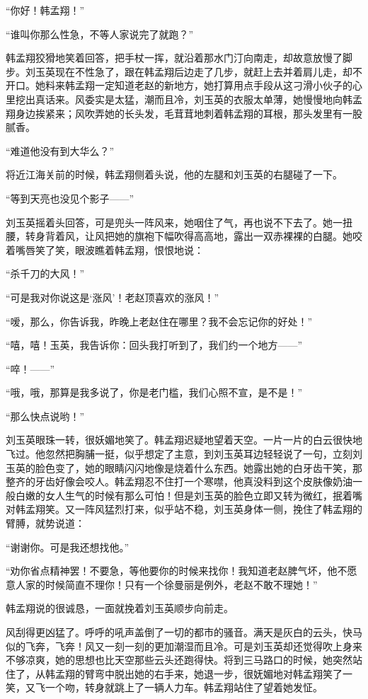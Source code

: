 \par “你好！韩孟翔！”
\par “谁叫你那么性急，不等人家说完了就跑？”
\par 韩孟翔狡猾地笑着回答，把手杖一挥，就沿着那水门汀向南走，却故意放慢了脚步。刘玉英现在不性急了，跟在韩孟翔后边走了几步，就赶上去并着肩儿走，却不开口。她料来韩孟翔一定知道老赵的新地方，她打算用点手段从这刁滑小伙子的心里挖出真话来。风委实是太猛，潮而且冷，刘玉英的衣服太单薄，她慢慢地向韩孟翔身边挨紧来；风吹弄她的长头发，毛茸茸地刺着韩孟翔的耳根，那头发里有一股腻香。
\par “难道他没有到大华么？”
\par 将近江海关前的时候，韩孟翔侧着头说，他的左腿和刘玉英的右腿碰了一下。
\par “等到天亮也没见个影子——”
\par 刘玉英摇着头回答，可是兜头一阵风来，她咽住了气，再也说不下去了。她一扭腰，转身背着风，让风把她的旗袍下幅吹得高高地，露出一双赤裸裸的白腿。她咬着嘴唇笑了笑，眼波瞧着韩孟翔，恨恨地说：
\par “杀千刀的大风！”
\par “可是我对你说这是‘涨风’！老赵顶喜欢的涨风！”
\par “嗳，那么，你告诉我，昨晚上老赵住在哪里？我不会忘记你的好处！”
\par “嘻，嘻！玉英，我告诉你：回头我打听到了，我们约一个地方——”
\par “啐！——”
\par “哦，哦，那算是我多说了，你是老门槛，我们心照不宣，是不是！”
\par “那么快点说哟！”
\par 刘玉英眼珠一转，很妖媚地笑了。韩孟翔迟疑地望着天空。一片一片的白云很快地飞过。他忽然把胸脯一挺，似乎想定了主意，到刘玉英耳边轻轻说了一句，立刻刘玉英的脸色变了，她的眼睛闪闪地像是烧着什么东西。她露出她的白牙齿干笑，那整齐的牙齿好像会咬人。韩孟翔忍不住打一个寒噤，他真没料到这个皮肤像奶油一般白嫩的女人生气的时候有那么可怕！但是刘玉英的脸色立即又转为微红，抿着嘴对韩孟翔笑。又一阵风猛烈打来，似乎站不稳，刘玉英身体一侧，挽住了韩孟翔的臂膊，就势说道：
\par “谢谢你。可是我还想找他。”
\par “劝你省点精神罢！不要急，等他要你的时候来找你！我知道老赵脾气坏，他不愿意人家的时候简直不理你！只有一个徐曼丽是例外，老赵不敢不理她！”
\par 韩孟翔说的很诚恳，一面就挽着刘玉英顺步向前走。
\par 风刮得更凶猛了。呼呼的吼声盖倒了一切的都市的骚音。满天是灰白的云头，快马似的飞奔，飞奔！风又一刻一刻的更加潮湿而且冷。可是刘玉英却还觉得吹上身来不够凉爽，她的思想也比天空那些云头还跑得快。将到三马路口的时候，她突然站住了，从韩孟翔的臂弯中脱出她的右手来，她退一步，很妩媚地对韩孟翔笑了一笑，又飞一个吻，转身就跳上了一辆人力车。韩孟翔站住了望着她发怔。
